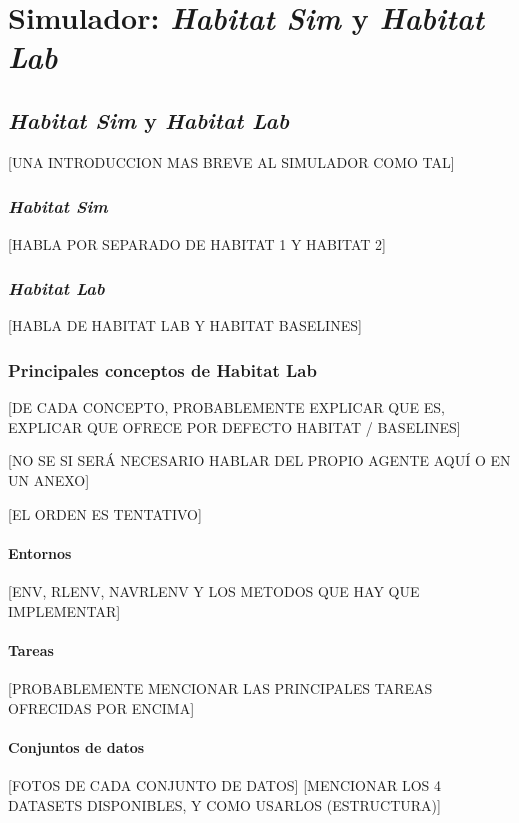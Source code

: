 \chapter{Simulador: \textit{Habitat Sim} y \textit{Habitat Lab}}

\section{\textit{Habitat Sim} y \textit{Habitat Lab}}
[UNA INTRODUCCION MAS BREVE AL SIMULADOR COMO TAL]

\subsection{\textit{Habitat Sim}}
[HABLA POR SEPARADO DE HABITAT 1 Y HABITAT 2]

\subsection{\textit{Habitat Lab}}
[HABLA DE HABITAT LAB Y HABITAT BASELINES]

\subsection{Principales conceptos de Habitat Lab}
[DE CADA CONCEPTO, PROBABLEMENTE EXPLICAR QUE ES, EXPLICAR QUE OFRECE POR DEFECTO HABITAT / BASELINES]

[NO SE SI SERÁ NECESARIO HABLAR DEL PROPIO AGENTE AQUÍ O EN UN ANEXO]

[EL ORDEN ES TENTATIVO]

\subsubsection{Entornos}

[ENV, RLENV, NAVRLENV Y LOS METODOS QUE HAY QUE IMPLEMENTAR]

\subsubsection{Tareas}
[PROBABLEMENTE MENCIONAR LAS PRINCIPALES TAREAS OFRECIDAS POR ENCIMA]

\subsubsection{Conjuntos de datos}
[FOTOS DE CADA CONJUNTO DE DATOS]
[MENCIONAR LOS 4 DATASETS DISPONIBLES, Y COMO USARLOS (ESTRUCTURA)]

